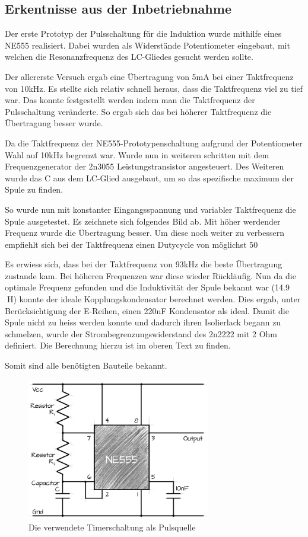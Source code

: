 \subsection{Erkentnisse aus der Inbetriebnahme}\label{sec:energieuebertragung}

Der erste Prototyp der Pulsschaltung für die Induktion wurde mithilfe eines NE555 realisiert. Dabei wurden als Widerstände Potentiometer eingebaut, mit welchen die Resonanzfrequenz des LC-Gliedes gesucht werden sollte.

Der allererste Versuch ergab eine Übertragung von 5mA bei einer Taktfrequenz von 10kHz. Es stellte sich relativ schnell heraus, dass die Taktfrequenz viel zu tief war. Das konnte festgestellt werden indem man die Taktfrequenz der Pulsschaltung veränderte. So ergab sich das bei höherer Taktfrequenz die Übertragung besser wurde.

Da die Taktfrequenz der NE555-Prototypenschaltung aufgrund der Potentiometer Wahl auf 10kHz begrenzt war. Wurde nun in weiteren schritten mit dem Frequenzgenerator der 2n3055 Leistungstransistor angesteuert. Des Weiteren wurde das C aus dem LC-Glied ausgebaut, um so das spezifische maximum der Spule zu finden.

So wurde nun mit konstanter Eingangsspannung und variabler Taktfrequenz die Spule ausgetestet. Es zeichnete sich folgendes Bild ab. Mit höher werdender Frequenz wurde die Übertragung besser. Um diese noch weiter zu verbessern empfiehlt sich bei der Taktfrequenz einen Dutycycle von möglichst 50%

Es erwiess sich, dass bei der Taktfrequenz von 93kHz die beste Übertragung zustande kam. Bei höheren Frequenzen war diese wieder Rückläufig. Nun da die optimale Frequenz gefunden und die Induktivität der Spule bekannt war (14.9 H) konnte der ideale Kopplungskondensator berechnet werden. Dies ergab, unter Berücksichtigung der E-Reihen, einen 220nF Kondensator als ideal. Damit die Spule nicht zu heiss werden konnte und dadurch ihren Isolierlack begann zu schmelzen, wurde der Strombegrenzungswiderstand des 2n2222 mit 2 Ohm definiert. Die Berechnung hierzu ist im oberen Text zu finden.

Somit sind alle benötigten Bauteile bekannt.

\begin{figure}[H]
	\begin{center}
		\includegraphics[width=80mm]{data/Ne555circuit.png}
		\caption[Ne555]{Die verwendete Timerschaltung als Pulsquelle} %
		\label{fig:Prototyp Down}
	\end{center}
\end{figure}

